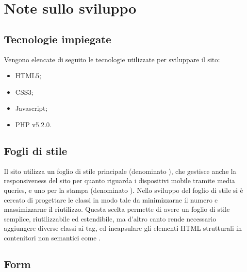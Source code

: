 \documentclass[12pt]{article}
\begin{document}
	\newpage
	\section{Note sullo sviluppo}
	
	\subsection{Tecnologie impiegate}
	
	Vengono elencate di seguito le tecnologie utilizzate per sviluppare il sito:
	
	\begin{itemize}
		\item HTML5;
		\item CSS3;
		\item Javascript;
		\item PHP v5.2.0.
	\end{itemize}
	
	\subsection{Fogli di stile}
	
	Il sito utilizza un foglio di stile principale (denominato ), che gestisce anche la responsiveness del sito per quanto riguarda i dispositivi mobile tramite media queries, e uno per la stampa (denominato ). Nello sviluppo del foglio di stile si è cercato di progettare le classi in modo tale da minimizzarne il numero e massimizzarne il riutilizzo. Questa scelta permette di avere un foglio di stile semplice, riutilizzabile ed estendibile, ma d'altro canto rende necessario aggiungere diverse classi ai tag, ed incapsulare gli elementi HTML strutturali in contenitori non semantici come . 
	
	\subsection{Form}
\end{document}
